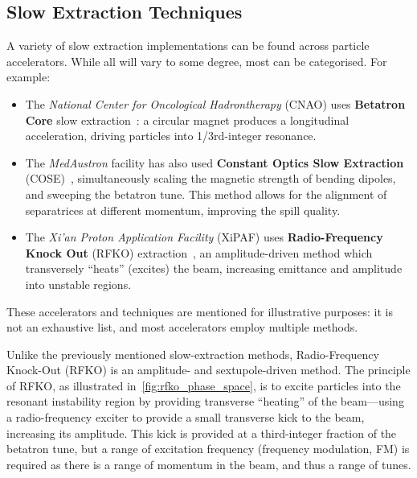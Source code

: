 \documentclass[11pt]{report}
\begin{document}
\subsection{Slow Extraction Techniques}


A variety of slow extraction implementations can be found across particle accelerators. While all will vary to some degree, most can be categorised. For example:
\begin{itemize}
  \item The \textit{National Center for Oncological Hadrontherapy} (CNAO) uses \textbf{Betatron Core} slow extraction~\cite{Falbo:IPAC2018-TUZGBF3}: a circular magnet produces a longitudinal acceleration, driving particles into 1/3rd-integer resonance.
  \item The \textit{MedAustron} facility has also used \textbf{Constant Optics Slow Extraction} (COSE)~\cite{ArrutiaSota:2845862}, simultaneously scaling the magnetic strength of bending dipoles, and sweeping the betatron tune. This method allows for the alignment of separatrices at different momentum, improving the spill quality.
  \item The \textit{Xi’an Proton Application Facility} (XiPAF) uses \textbf{Radio-Frequency Knock Out} (RFKO) extraction~\cite{Yao:2016cnf}, an amplitude-driven method which transversely ``heats'' (excites) the beam, increasing emittance and amplitude into unstable regions.
\end{itemize}
These accelerators and techniques are mentioned for illustrative purposes: it is not an exhaustive list, and most accelerators employ multiple methods.

 

Unlike the previously mentioned slow-extraction methods, Radio-Frequency Knock-Out (RFKO) is an amplitude- and sextupole-driven method. The principle of RFKO, as illustrated in~\autoref{fig:rfko_phase_space}, is to excite particles into the resonant instability region by providing transverse ``heating'' of the beam---using a radio-frequency exciter to provide a small transverse kick to the beam, increasing its amplitude. This kick is provided at a third-integer fraction of the betatron tune, but a range of excitation frequency (frequency modulation, FM) is required as there is a range of momentum in the beam, and thus a range of tunes. 
\end{document}
